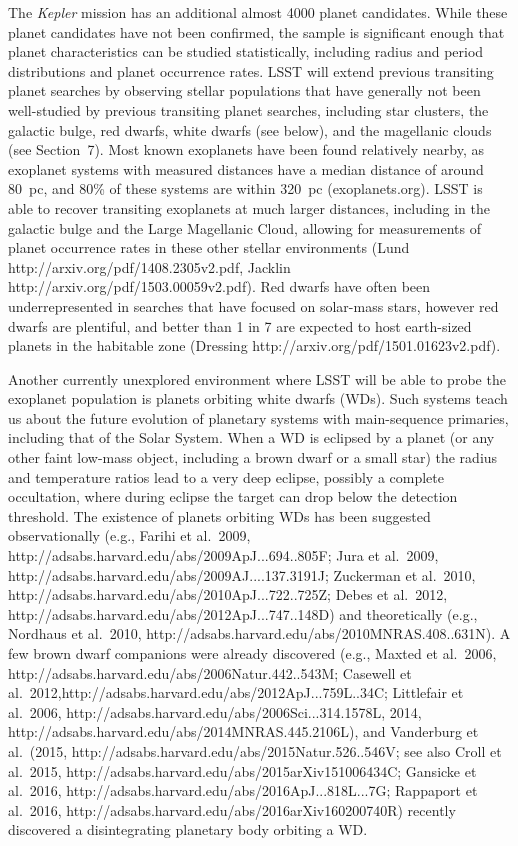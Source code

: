 The {\it Kepler} mission has an additional almost 4000 planet candidates. While these planet candidates have not been confirmed, the sample is significant enough that planet characteristics can be studied statistically, including radius and period distributions and planet occurrence rates. LSST will extend previous transiting planet searches by observing stellar populations that have generally not been well-studied by previous transiting planet searches, including star clusters, the galactic bulge, red dwarfs, white dwarfs (see below), and the magellanic clouds (see Section~7). Most known exoplanets have been found relatively nearby, as exoplanet systems with measured distances have a median distance of around 80~pc, and 80\% of these systems are within 320~pc (exoplanets.org). LSST is able to recover transiting exoplanets at much larger distances, including in the galactic bulge and the Large Magellanic Cloud, allowing for measurements of planet occurrence rates in these other stellar environments (Lund http://arxiv.org/pdf/1408.2305v2.pdf, Jacklin http://arxiv.org/pdf/1503.00059v2.pdf). Red dwarfs have often been underrepresented in searches that have focused on solar-mass stars, however red dwarfs are plentiful, and better than 1 in 7 are expected to host earth-sized planets in the habitable zone (Dressing http://arxiv.org/pdf/1501.01623v2.pdf).

Another currently unexplored environment where LSST will be able to probe the exoplanet population is planets orbiting white dwarfs (WDs). Such systems teach us about the future evolution of planetary systems with main-sequence primaries, including that of the Solar System. When a WD is eclipsed by a planet (or any other faint low-mass object, including a brown dwarf or a small star) the radius and temperature ratios lead to a very deep eclipse, possibly a complete occultation, where during eclipse the target can drop below the detection threshold. The existence of planets orbiting WDs has been suggested observationally (e.g., Farihi et al.~2009, http://adsabs.harvard.edu/abs/2009ApJ...694..805F; Jura et al.~2009, http://adsabs.harvard.edu/abs/2009AJ....137.3191J; Zuckerman et al.~2010, http://adsabs.harvard.edu/abs/2010ApJ...722..725Z; Debes et al.~2012, http://adsabs.harvard.edu/abs/2012ApJ...747..148D) and theoretically (e.g., Nordhaus et al.~2010, http://adsabs.harvard.edu/abs/2010MNRAS.408..631N). A few brown dwarf companions were already discovered (e.g., Maxted et al.~2006, http://adsabs.harvard.edu/abs/2006Natur.442..543M; Casewell et al.~2012,http://adsabs.harvard.edu/abs/2012ApJ...759L..34C; Littlefair et al.~2006, http://adsabs.harvard.edu/abs/2006Sci...314.1578L, 2014, http://adsabs.harvard.edu/abs/2014MNRAS.445.2106L), and Vanderburg et al.~(2015, http://adsabs.harvard.edu/abs/2015Natur.526..546V; see also Croll et al.~2015, http://adsabs.harvard.edu/abs/2015arXiv151006434C; Gansicke et al.~2016, http://adsabs.harvard.edu/abs/2016ApJ...818L...7G; Rappaport et al.~2016, http://adsabs.harvard.edu/abs/2016arXiv160200740R) recently discovered a disintegrating planetary body orbiting a WD.

